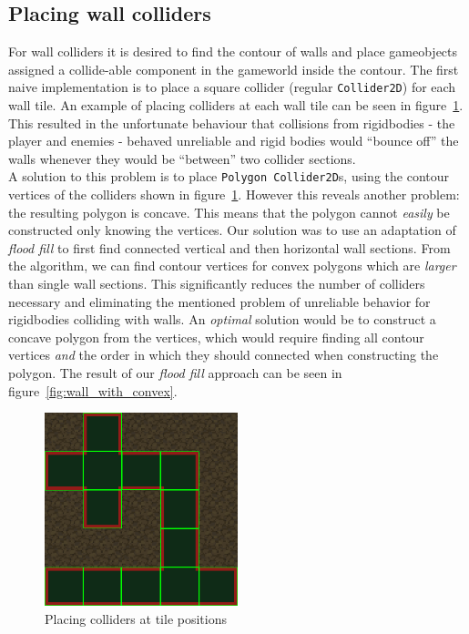 \subsection{Placing wall colliders}
For wall colliders it is desired to find the contour of walls and place gameobjects assigned a collide-able component in the gameworld inside the contour.
The first naive implementation is to place a square collider (regular \texttt{Collider2D}) for each wall tile.
An example of placing colliders at each wall tile can be seen in figure~\ref{fig:wall_with_vertices}.
This resulted in the unfortunate behaviour that collisions from rigidbodies - the player and enemies - behaved unreliable and rigid bodies would ``bounce off'' the walls whenever they would be ``between'' two collider sections.
\\
A solution to this problem is to place \texttt{Polygon Collider2D}s, using the contour vertices of the colliders shown in figure~\ref{fig:wall_with_vertices}. 
However this reveals another problem: the resulting polygon is concave.
This means that the polygon cannot \textit{easily} be constructed only knowing the vertices.
Our solution was to use an adaptation of \textit{flood fill} to first find connected vertical and then horizontal wall sections.
From the algorithm, we can find contour vertices for convex polygons which are \textit{larger} than single wall sections.
This significantly reduces the number of colliders necessary and eliminating the mentioned problem of unreliable behavior for rigidbodies colliding with walls.
An \textit{optimal} solution would be to construct a concave polygon from the vertices, which would require finding all
contour vertices \textit{and} the order in which they should connected when constructing the polygon.
The result of our \textit{flood fill} approach can be seen in figure~\ref{fig:wall_with_convex}.

\begin{figure}[H]
    \centering
    \includegraphics[width=0.5\textwidth]{figures/generating_levels/wall_with_vertices.png}
    \caption{Placing colliders at tile positions}\label{fig:wall_with_vertices} 
\end{figure}

